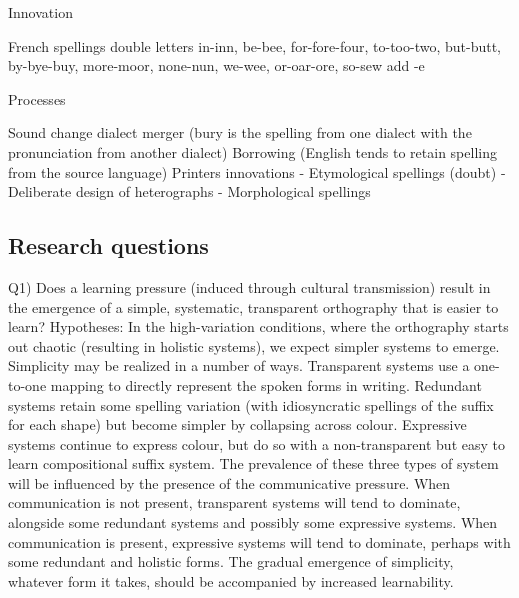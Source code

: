 \documentclass[doc,biblatex]{apa7}
\begin{document}
Innovation

French spellings
double letters in-inn, be-bee, for-fore-four, to-too-two, but-butt, by-bye-buy, more-moor, none-nun, we-wee, or-oar-ore, so-sew
add -e


Processes

Sound change
dialect merger (bury is the spelling from one dialect with the pronunciation from another dialect)
Borrowing (English tends to retain spelling from the source language)
Printers innovations
- Etymological spellings (doubt)
- Deliberate design of heterographs
- Morphological spellings

\subsection{Research questions}

Q1) Does a learning pressure (induced through cultural transmission) result in the emergence of a simple, systematic, transparent orthography that is easier to learn? Hypotheses: In the high-variation conditions, where the orthography starts out chaotic (resulting in holistic systems), we expect simpler systems to emerge. Simplicity may be realized in a number of ways. Transparent systems use a one-to-one mapping to directly represent the spoken forms in writing. Redundant systems retain some spelling variation (with idiosyncratic spellings of the suffix for each shape) but become simpler by collapsing across colour. Expressive systems continue to express colour, but do so with a non-transparent but easy to learn compositional suffix system. The prevalence of these three types of system will be influenced by the presence of the communicative pressure. When communication is not present, transparent systems will tend to dominate, alongside some redundant systems and possibly some expressive systems. When communication is present, expressive systems will tend to dominate, perhaps with some redundant and holistic forms. The gradual emergence of simplicity, whatever form it takes, should be accompanied by increased learnability.
\end{document}

